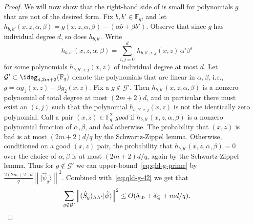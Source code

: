 \documentclass[11pt]{article}
\theoremstyle{definition}
\newcommand{\ket}[1]{|#1\rangle}
\newcommand{\F}{\ensuremath{\mathbb{F}}}
\newcommand{\ld}{\textsc{ld}}
\newcommand{\norm}[1]{\left\| {#1} \right\|}
\newcommand{\labelstyle}[1]{\ensuremath{\textsc{#1}}\xspace}
\newcommand{\alice}{\labelstyle{A}}
\begin{document}
\begin{proof}
	 We will now show that the right-hand side of  is small for polynomials $g$ that are not of the desired form. 
	Fix $b,b' \in \F_q$, and let $h_{b,b'}(x,z,\alpha,\beta) = g(x,z,\alpha,\beta) - (\alpha b + \beta b')$. Observe that since $g$ has individual degree $d$, so does $h_{b,b'}$. Write 
	\[
	h_{b,b'}(x,z,\alpha,\beta) = \sum_{i,j=0}^{d}\, h_{b,b',i,j}(x,z) \,  \alpha^i \beta^j 
	\]
	for some polynomials $h_{b,b',i,j}(x,z)$ of individual degree at most $d$. 
	Let $\mathcal{G}' \subset \ideg_{d,2m+2}(\F_q)$ denote the polynomials that are linear in $\alpha, \beta$, i.e., $g = \alpha g_1(x,z) + \beta g_2(x,z)$. Fix a $g \notin \mathcal{G}'$. Then $h_{b,b'}(x,z,\alpha,\beta)$ is a nonzero polynomial of total degree at most $(2m+2)d$, and in particular there must exist an $(i,j)$ such that the polynomial $h_{b,b',i,j}(x,z)$ is not the identically zero polynomial. Call a pair $(x,z) \in \F_q^2$ \emph{good} if $h_{b,b'}(x,z,\alpha,\beta)$ is a nonzero polynomial function of $\alpha,\beta$, and \emph{bad} otherwise. The probability that $(x,z)$ is bad is at most $(2m+2)d/q$ by the Schwartz-Zippel lemma. Otherwise, conditioned on a good $(x,z)$ pair, the probability that $h_{b,b'}(x,z,\alpha,\beta)=0$ over the choice of $\alpha,\beta$ is at most $(2m+2)d/q$, again by the Schwartz-Zippel lemma. Thus for $g \notin \mathcal{G}'$ we can upper-bound~\eqref{eq:qld-g-prime} by $\frac{2(2m+2)d}{q} \norm{ \ket{\hat{\psi}_g}}^2$. Combined with~\eqref{eq:qld-g-42} we get that
	\begin{equation}
	\label{eq:qld-g-prime-bound}
		\sum_{g \notin \mathcal{G}'} \norm{ (\hat{S}_g)_{\alice \alice'} \ket{\hat{\psi}}}^2 \leq O(\delta_\ld + \delta_Q + md/q).
	\end{equation}
	





\end{proof}
\end{document}
